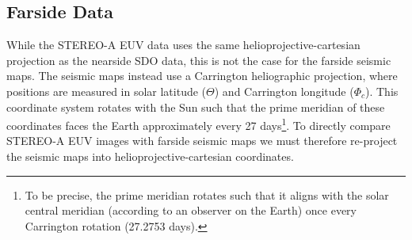 \documentclass[11pt,a4paper,onecolumn]{report}
\begin{document}

\subsection{Farside Data}
While the STEREO-A EUV data uses the same helioprojective-cartesian projection
as the nearside SDO data, this is not the case for the farside seismic maps. The
seismic maps instead use a Carrington heliographic projection, where positions
are measured in solar latitude (\(\Theta\)) and Carrington longitude
(\(\Phi_c\)). This coordinate system rotates with the Sun such that the prime
meridian of these coordinates faces the Earth approximately every 27
days\footnote{To be precise, the prime meridian rotates such that it aligns with
the solar central meridian (according to an observer on the Earth) once every
Carrington rotation (27.2753 days).}. To directly compare STEREO-A EUV images
with farside seismic maps we must therefore re-project the seismic maps into
helioprojective-cartesian coordinates. \\
\end{document}
